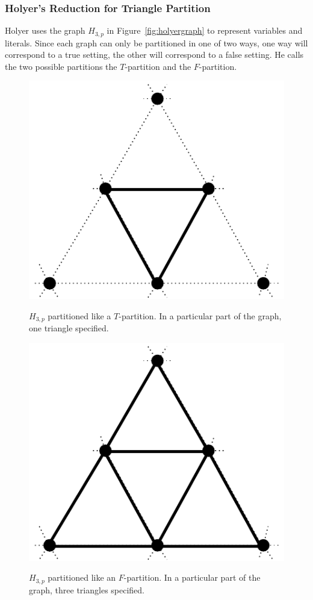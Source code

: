 \documentclass[runningheads,a4paper]{llncs}
\begin{document}
\subsubsection{Holyer's Reduction for Triangle Partition}
%
%
% 
Holyer uses the graph $H_{3,p}$ in Figure~\ref{fig:holyergraph} to represent variables and literals. Since each graph can only be partitioned in one of two ways, one way will correspond to a true setting, the other will correspond to a false setting. He calls the two possible partitions the $T$-partition and the $F$-partition. 

\begin{figure}
\begin{minipage}{0.5\linewidth}
\centering
\includegraphics[scale=0.5]{Tpartition.pdf}
\label{fig:tpart}
\caption{$H_{3,p}$ partitioned like a $T$-partition. In a particular part of the graph, one triangle specified.}
\end{minipage}
\hfill
\begin{minipage}{0.5\linewidth}
\centering
\label{fig:fpart}
\includegraphics[scale=0.5]{Fpartition.pdf}
\caption{$H_{3,p}$ partitioned like an $F$-partition. In a particular part of the graph, three triangles specified.}
\end{minipage}
\end{figure}
\end{document}
